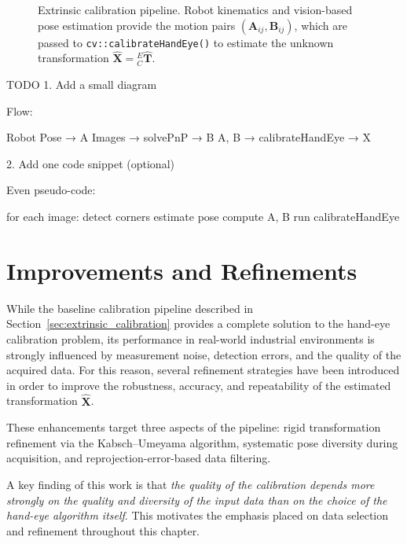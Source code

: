 \begin{figure}[htbp]
    \caption{Extrinsic calibration pipeline. Robot kinematics and
             vision-based pose estimation provide the motion pairs
             $(\mathbf{A}_{ij}, \mathbf{B}_{ij})$, which are passed to
             \texttt{cv::calibrateHandEye()} to estimate the unknown
             transformation $\hat{\mathbf{X}} = {}^E_C\hat{\mathbf{T}}$.}
    \label{fig:extrinsic_pipeline}
\end{figure}



TODO
1. Add a small diagram

Flow:

Robot Pose → A  
Images → solvePnP → B  
A, B → calibrateHandEye → X


2. Add one code snippet (optional)

Even pseudo-code:

for each image:
    detect corners
    estimate pose
compute A, B
run calibrateHandEye





\section{Improvements and Refinements}
\label{sec:improvements}

While the baseline calibration pipeline described in
Section~\ref{sec:extrinsic_calibration} provides a complete solution to the
hand-eye calibration problem, its performance in real-world industrial
environments is strongly influenced by measurement noise, detection errors, and
the quality of the acquired data. For this reason, several refinement strategies
have been introduced in order to improve the robustness, accuracy, and
repeatability of the estimated transformation $\hat{\mathbf{X}}$.

These enhancements target three aspects of the pipeline: rigid transformation
refinement via the Kabsch--Umeyama algorithm, systematic pose diversity during acquisition, and
reprojection-error-based data filtering.

A key finding of this work is that \textit{the quality of the calibration
depends more strongly on the quality and diversity of the input data than on
the choice of the hand-eye algorithm itself}. This motivates the emphasis
placed on data selection and refinement throughout this chapter.

